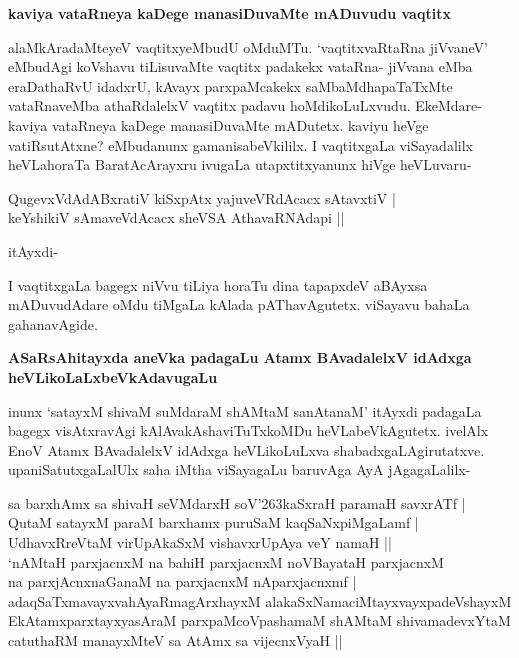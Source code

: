 {\bigskip
\noindent
{\large\bf kaviya vataRneya kaDege manasiDuvaMte mADuvudu vaqtitx}}\label{page245a}
\medskip

\noindent
alaMkAradaMteyeV vaqtitxyeMbudU oMduMTu. `vaqtitxvaRtaRna jiVvaneV' eMbudAgi koVshavu tiLisuvaMte vaqtitx padakekx vataRna- jiVvana eMba eraDathaRvU idadxrU, kAvayx parxpaMcakekx saMbaMdhapaTaTxMte vataRnaveMba athaRdalelxV vaqtitx padavu hoMdikoLuLxvudu. EkeMdare- kaviya vataRneya kaDege manasiDuvaMte mADutetx. kaviyu heVge vatiRsutAtxne? eMbudanunx gamanisabeVkililx. I vaqtitxgaLa viSayadalilx heVLahoraTa BaratAcArayxru ivugaLa utapxtitxyanunx hiVge heVLuvaru-

\begin{shloka}
QugevxVdAdABxratiV kiSxpAtx yajuveVRdAcacx sAtavxtiV |\\\label{245a}
keYshikiV sAmaveVdAcacx sheVSA AthavaRNAdapi || 
\end{shloka}
\noindent
itAyxdi-

I vaqtitxgaLa bagegx niVvu tiLiya horaTu dina tapapxdeV aBAyxsa mADuvudAdare oMdu tiMgaLa kAlada pAThavAgutetx. viSayavu bahaLa gahanavAgide.

{\bigskip
\noindent
{\large\bf ASaRsAhitayxda aneVka padagaLu Atamx BAvadalelxV idAdxga heVLikoLaLxbeVkAdavugaLu}}
\medskip

\noindent
inunx `satayxM shivaM suMdaraM shAMtaM sanAtanaM' itAyxdi padagaLa bagegx visAtxravAgi kAlAvakAshaviTuTxkoMDu heVLabeVkAgutetx. ivelAlx EnoV Atamx BAvadalelxV idAdxga heVLikoLuLxva shabadxgaLAgirutatxve. upaniSatutxgaLalUlx saha iMtha viSayagaLu baruvAga AyA jAgagaLalilx-

\begin{shloka}
sa barxhAmx sa shivaH seVMdarxH soV\char'263kaSxraH paramaH savxrATf |\\\label{246}
QutaM satayxM paraM barxhamx puruSaM kaqSaNxpiMgaLamf |\\\label{246a}
UdhavxRreVtaM virUpAkaSxM vishavxrUpAya veY namaH ||\\
`nAMtaH parxjacnxM na bahiH parxjacnxM noVBayataH parxjacnxM \\\label{246b}
na parxjAcnxnaGanaM na parxjacnxM nAparxjacnxmf |\\
adaqSaTxmavayxvahAyaRmagArxhayxM alakaSxNamaciMtayxvayxpadeVshayxM \\
EkAtamxparxtayxyasAraM parxpaMcoVpashamaM shAMtaM shivamadevxYtaM \\
catuthaRM manayxMteV sa AtAmx sa vijecnxVyaH ||
\end{shloka}


